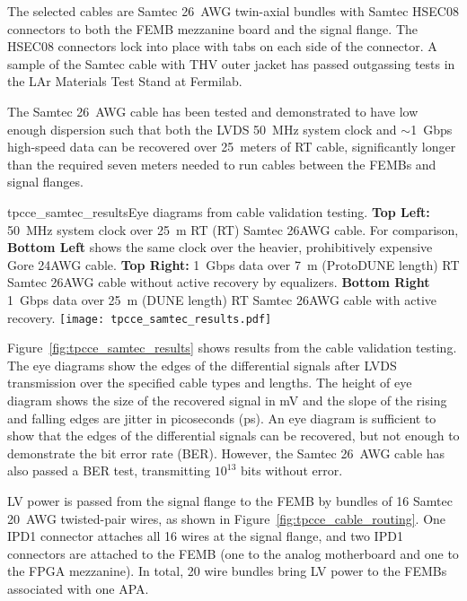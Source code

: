 The selected cables are Samtec 26~AWG twin-axial bundles with Samtec HSEC08 connectors to both
the FEMB mezzanine board and the signal flange. 
The HSEC08
connectors lock into place with tabs on each side of the connector. A sample of the Samtec cable with
THV outer jacket has passed outgassing tests in the LAr Materials Test Stand at Fermilab.

The Samtec 26~AWG cable has been
tested and demonstrated to have low enough dispersion such that both the LVDS 50~MHz system clock and
$\sim$1~Gbps high-speed data can be recovered over 25~meters of RT cable, 
significantly longer than the required seven meters needed to run cables between the FEMBs and signal flanges.

\begin{cdrfigure}{tpcce_samtec_results}{Eye diagrams 
from cable validation testing. {\bf Top Left:} 50~MHz system clock over 25~m RT  
(RT) Samtec 26AWG cable. For comparison, {\bf Bottom Left} shows the same clock over 
the heavier, prohibitively expensive Gore 24AWG cable. {\bf Top Right:} 1~Gbps data over 
7~m (ProtoDUNE length) RT Samtec 26AWG cable without active recovery by equalizers. {\bf Bottom Right} 1~Gbps
data over 25~m (DUNE length) RT Samtec 26AWG cable with active recovery.}
\texttt{[image: tpcce\_samtec\_results.pdf]}
\end{cdrfigure}

Figure~\ref{fig:tpcce_samtec_results} shows results from the cable 
validation testing. The eye diagrams show the edges of the differential signals after 
LVDS transmission over the specified cable types and lengths. The height of eye diagram shows the size 
of the recovered signal in mV and the slope of the rising and falling edges are jitter in picoseconds (ps). 
An eye diagram is sufficient to show that the edges of the differential signals can
be recovered, but not enough to demonstrate the bit error rate (BER). However, the Samtec 26~AWG cable has 
also passed a BER test, transmitting $10^{13}$ bits without error.



LV power is passed from the signal flange to the FEMB by bundles of 16 Samtec 
20~AWG twisted-pair wires, as shown in Figure~\ref{fig:tpcce_cable_routing}. One IPD1 connector
attaches all 16 wires at the signal flange, and two IPD1 connectors are attached to the FEMB (one to the
analog motherboard and one to the FPGA mezzanine). In total, 20 wire bundles 
 bring LV power to the FEMBs associated with one APA.

